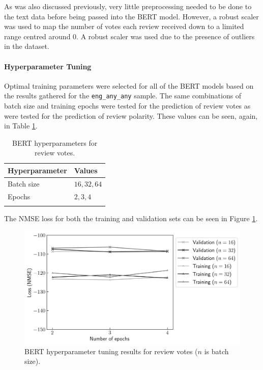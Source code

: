 As was also discussed previously, very little preprocessing needed to be done to the text data before being passed into the BERT model. However, a robust scaler was used to map the number of votes each review received down to a limited range centred around 0. A robust scaler was used due to the presence of outliers in the dataset.

\paragraph{Hyperparameter Tuning}

Optimal training parameters were selected for all of the BERT models based on the results gathered for the \texttt{eng\_any\_any} sample. The same combinations of batch size and training epochs were tested for the prediction of review votes as were tested for the prediction of review polarity. These values can be seen, again, in Table \ref{tab:DI_RF_Votes_BERTHP}.

\begin{table}[ht]
    \centering
    \begin{tabular}{l l}
        \toprule
        \textbf{Hyperparameter} & \textbf{Values}\\\midrule
        Batch size & $16, 32, 64$\\
        Epochs & $2, 3, 4$\\
        \bottomrule\\
    \end{tabular}
    \caption{BERT hyperparameters for review votes.}
    \label{tab:DI_RF_Votes_BERTHP}
\end{table}

The NMSE loss for both the training and validation sets can be seen in Figure \ref{fig:DI_RF_Votes_BERTHP}.

\begin{figure}[ht]
    \centering
    \includegraphics[scale=0.7]{figures/05_impl/01_rfp/02_votes/plot_hyperparams_bert.png}
    \caption{BERT hyperparameter tuning results for review votes ($n$ is batch size).}
    \label{fig:DI_RF_Votes_BERTHP}
\end{figure}

